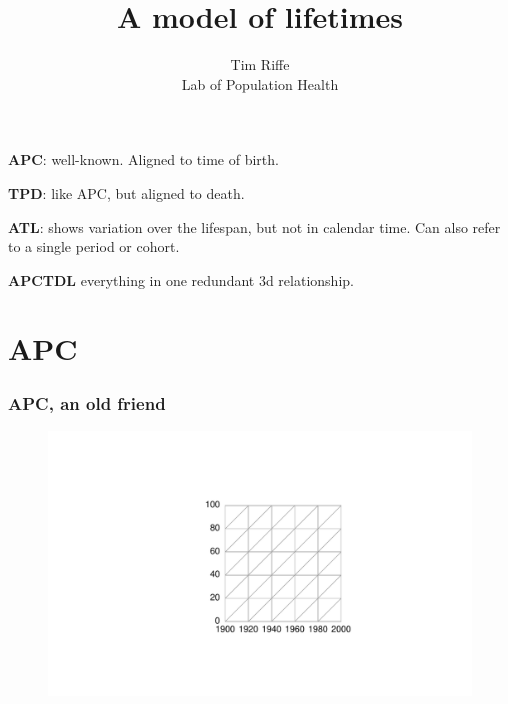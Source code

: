 \documentclass[20pt]{beamer}
\title{A model of lifetimes}
\subtitle{Tim Riffe\\ Lab of Population Health}		%
\begin{document}
\begin{frame}
	\titlepage
\end{frame}


\begin{frame}%
  \begin{description}
    \item<1->{\textbf{APC}:} well-known. Aligned to time of birth.
    \item<2->{\textbf{TPD}:} like APC, but aligned to death.
    \item<3->{\textbf{ATL}:} shows variation over the lifespan, but not in
    calendar time. Can also refer to a single period or cohort.
    \item<4->{\textbf{APCTDL}} everything in one redundant 3d relationship.
  \end{description}
\end{frame}


\section{APC}
\begin{frame}
\frametitle{APC, an old friend}
\begin{figure}[b]
    \centering
    \includegraphics{Figures/LabPres/APC1.pdf}
\end{figure} 
\end{frame}
\end{document}
